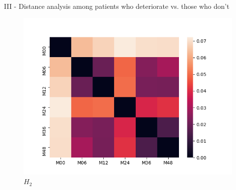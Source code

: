 \documentclass[aspectratio=169, 10pt, dvipsnames]{beamer}
\begin{document}
\begin{frame}[fragile]{III - Distance analysis among patients who deteriorate vs. those who don't}
\begin{figure}
  \end{figure}%
  \endminipage
  \hfill
  \begin{figure}
    \centering
    \includegraphics[width=\textwidth]{figures/temporal_evolution/ADNI029S0878_h_2.png}
    \caption{$H_2$}
  \end{figure}
  \endminipage
\end{frame}
\end{document}

